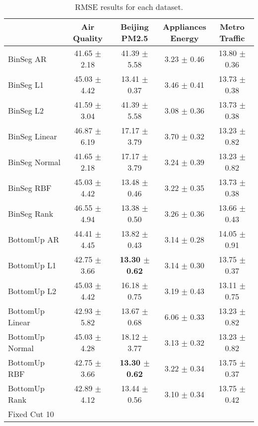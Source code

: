 \begin{table}[!htpb] \small
    \caption{RMSE results for each dataset.}
    \centering
    \begin{tabular}{lcccc}
        \toprule
        & \makecell{\textbf{Air}\\\textbf{Quality}} 
        & \makecell{\textbf{Beijing}\\\textbf{PM2.5}} 
        & \makecell{\textbf{Appliances}\\\textbf{Energy}} 
        & \makecell{\textbf{Metro}\\\textbf{Traffic}} \\
        \midrule
BinSeg AR & 41.65 $\pm$ 2.18 & 41.39 $\pm$ 5.58 & 3.23 $\pm$ 0.46 & 13.80 $\pm$ 0.36 \\
BinSeg L1 & 45.03 $\pm$ 4.42 & 13.41 $\pm$ 0.37 & 3.46 $\pm$ 0.41 & 13.73 $\pm$ 0.38 \\
BinSeg L2 & 41.59 $\pm$ 3.04 & 41.39 $\pm$ 5.58 & 3.08 $\pm$ 0.36 & 13.73 $\pm$ 0.38 \\
BinSeg Linear & 46.87 $\pm$ 6.19 & 17.17 $\pm$ 3.79 & 3.70 $\pm$ 0.32 & 13.23 $\pm$ 0.82 \\
BinSeg Normal & 41.65 $\pm$ 2.18 & 17.17 $\pm$ 3.79 & 3.24 $\pm$ 0.39 & 13.23 $\pm$ 0.82 \\
BinSeg RBF & 45.03 $\pm$ 4.42 & 13.48 $\pm$ 0.46 & 3.22 $\pm$ 0.35 & 13.73 $\pm$ 0.38 \\
BinSeg Rank & 46.55 $\pm$ 4.94 & 13.38 $\pm$ 0.50 & 3.26 $\pm$ 0.36 & 13.66 $\pm$ 0.43 \\
BottomUp AR & 44.41 $\pm$ 4.45 & 13.82 $\pm$ 0.43 & 3.14 $\pm$ 0.28 & 14.05 $\pm$ 0.91 \\
BottomUp L1 & 42.75 $\pm$ 3.66 & \textbf{13.30 $\pm$ 0.62} & 3.14 $\pm$ 0.30 & 13.75 $\pm$ 0.37 \\
BottomUp L2 & 45.03 $\pm$ 4.42 & 16.18 $\pm$ 0.75 & 3.19 $\pm$ 0.43 & 13.11 $\pm$ 0.75 \\
BottomUp Linear & 42.93 $\pm$ 5.82 & 13.67 $\pm$ 0.68 & 6.06 $\pm$ 0.33 & 13.23 $\pm$ 0.82 \\
BottomUp Normal & 45.03 $\pm$ 4.28 & 18.12 $\pm$ 3.77 & 3.13 $\pm$ 0.32 & 13.23 $\pm$ 0.82 \\
BottomUp RBF & 42.75 $\pm$ 3.66 & \textbf{13.30 $\pm$ 0.62} & 3.22 $\pm$ 0.34 & 13.75 $\pm$ 0.37 \\
BottomUp Rank & 42.89 $\pm$ 4.12 & 13.44 $\pm$ 0.56 & 3.10 $\pm$ 0.34 & 13.75 $\pm$ 0.42 \\
Fixed Cut 10%

\end{tabular}
\end{table}
